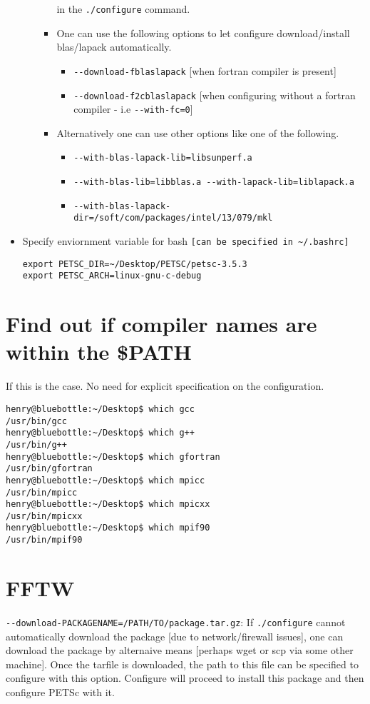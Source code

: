 \documentclass{article}
\begin{document}
\begin{itemize}
\begin{itemize}
\begin{itemize}
in the \verb+./configure+ command.
\item One can use the following options to let configure download/install blas/lapack automatically.
\begin{itemize}
\item \verb+--download-fblaslapack+ [when fortran compiler is present]
\item \verb+--download-f2cblaslapack+ [when configuring without a fortran compiler - i.e \verb+--with-fc=0+]
\end{itemize} 
\item  Alternatively one can use other options like one of the following.
\begin{itemize}
\item \verb+--with-blas-lapack-lib=libsunperf.a+
\item \verb+--with-blas-lib=libblas.a --with-lapack-lib=liblapack.a+
\item \verb+--with-blas-lapack-dir=/soft/com/packages/intel/13/079/mkl+ 
\end{itemize}  
\end{itemize}
\end{itemize}
\item Specify enviornment variable for bash \verb+[can be specified in ~/.bashrc]+
\begin{verbatim}
export PETSC_DIR=~/Desktop/PETSC/petsc-3.5.3
export PETSC_ARCH=linux-gnu-c-debug
\end{verbatim}
\end{itemize}
\section{Find out if compiler names are within the \$PATH} If this is the case. No need for explicit specification on the configuration.
\begin{footnotesize}\begin{verbatim}
henry@bluebottle:~/Desktop$ which gcc
/usr/bin/gcc
henry@bluebottle:~/Desktop$ which g++
/usr/bin/g++
henry@bluebottle:~/Desktop$ which gfortran
/usr/bin/gfortran
henry@bluebottle:~/Desktop$ which mpicc
/usr/bin/mpicc
henry@bluebottle:~/Desktop$ which mpicxx
/usr/bin/mpicxx
henry@bluebottle:~/Desktop$ which mpif90
/usr/bin/mpif90
\end{verbatim}\end{footnotesize}
\section{FFTW}
\verb+--download-PACKAGENAME=/PATH/TO/package.tar.gz+: If \verb+./configure+ cannot automatically download the package [due to network/firewall issues], one can download the package by alternaive means [perhaps wget or scp via some other machine]. Once the tarfile is downloaded, the path to this file can be specified to configure with this option. Configure will proceed to install this package and then configure PETSc with it.
\end{document}
